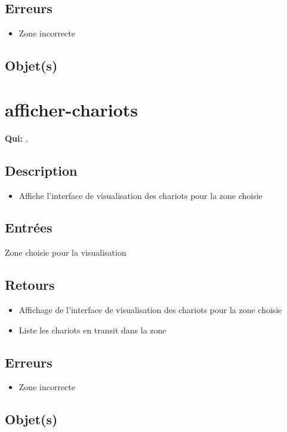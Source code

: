 	\subsection{Erreurs}
	\begin{itemize}
		\item Zone incorrecte \fatal
	\end{itemize}

	\subsection{Objet(s)}
		\circobjs

\section{afficher-chariots}
	\textbf{Qui:} \us, \urt

	\subsection{Description}
	\begin{itemize}
		\item Affiche l'interface de visualisation des chariots pour la zone choisie
	\end{itemize}

	\subsection{Entrées}
		Zone choisie pour la visualisation

	\subsection{Retours}
	\begin{itemize}
		\item Affichage de l'interface de visualisation des chariots pour la zone choisie
		\item Liste les chariots en transit dans la zone
	\end{itemize}

	\subsection{Erreurs}
	\begin{itemize}
		\item Zone incorrecte \fatal
	\end{itemize}

	\subsection{Objet(s)}
		\circobjs

